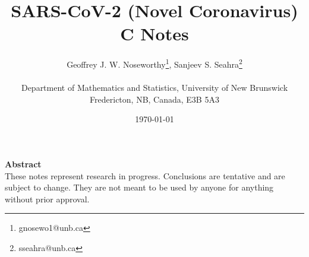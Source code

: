 \documentclass{article}
\numberwithin{equation}{section} %
\theoremstyle{definition}
\begin{document}
\title{SARS-CoV-2 (Novel Coronavirus) C Notes}
\date{\today}
\author{Geoffrey J. W. Noseworthy\footnote{gnosewo1@unb.ca}, Sanjeev S. Seahra\footnote{sseahra@unb.ca} \\ \\ Department of Mathematics and Statistics, University of New Brunswick \\ Fredericton, NB, Canada, E3B 5A3}

\maketitle

\newpage

{\centering \Large \textbf{Abstract} \\
  \normalsize These notes represent research in progress. Conclusions are tentative and are subject to change. They are not meant to be used by anyone for anything without prior approval.}

\tableofcontents

\newpage
\end{document}
